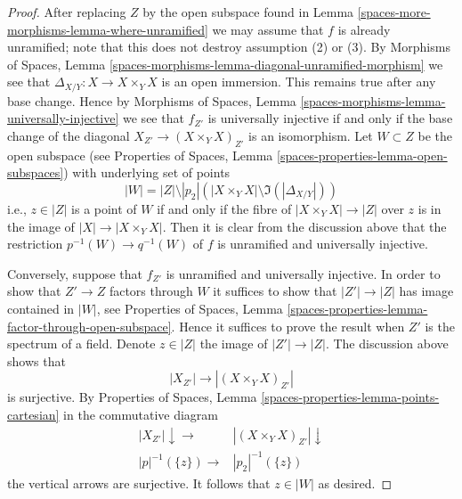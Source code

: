 \begin{proof}
After replacing $Z$ by the open subspace found in
Lemma \ref{spaces-more-morphisms-lemma-where-unramified}
we may assume that $f$ is already unramified; note that this does not
destroy assumption (2) or (3). By
Morphisms of Spaces, Lemma
\ref{spaces-morphisms-lemma-diagonal-unramified-morphism}
we see that $\Delta_{X/Y} : X \to X \times_Y X$ is an open immersion.
This remains true after any base change. Hence by
Morphisms of Spaces, Lemma
\ref{spaces-morphisms-lemma-universally-injective}
we see that $f_{Z'}$ is universally injective if and only if
the base change of the diagonal $X_{Z'} \to (X \times_Y X)_{Z'}$
is an isomorphism. Let $W \subset Z$ be the open subspace
(see
Properties of Spaces, Lemma
\ref{spaces-properties-lemma-open-subspaces})
with underlying set of points
$$
|W| = |Z| \setminus
|p_2|\left(|X \times_Y X| \setminus \Im(|\Delta_{X/Y}|)\right)
$$
i.e., $z \in |Z|$ is a point of $W$ if and only if the fibre of
$|X \times_Y X| \to |Z|$ over $z$ is in the image of
$|X| \to |X \times_Y X|$. Then it is clear from the discussion above
that the restriction $p^{-1}(W) \to q^{-1}(W)$ of $f$ is
unramified and universally injective.

\medskip\noindent
Conversely, suppose that $f_{Z'}$ is unramified and universally injective.
In order to show that $Z' \to Z$ factors through $W$ it suffices to show
that $|Z'| \to |Z|$ has image contained in $|W|$, see
Properties of Spaces, Lemma
\ref{spaces-properties-lemma-factor-through-open-subspace}.
Hence it suffices to prove the result when $Z'$ is the spectrum of a field.
Denote $z \in |Z|$ the image of $|Z'| \to |Z|$. The discussion above shows
that
$$
|X_{Z'}| \longrightarrow |(X \times_Y X)_{Z'}|
$$
is surjective. By
Properties of Spaces,
Lemma \ref{spaces-properties-lemma-points-cartesian}
in the commutative diagram
$$
\begin{array}{cc}|X_{Z'}| \downarrow\longrightarrow & |(X \times_Y X)_{Z'}| \downarrow \\ |p|^{-1}(\{z\}) \longrightarrow & |p_2|^{-1}(\{z\})\end{array}
$$
the vertical arrows are surjective. It follows that $z \in |W|$ as desired.
\end{proof}


